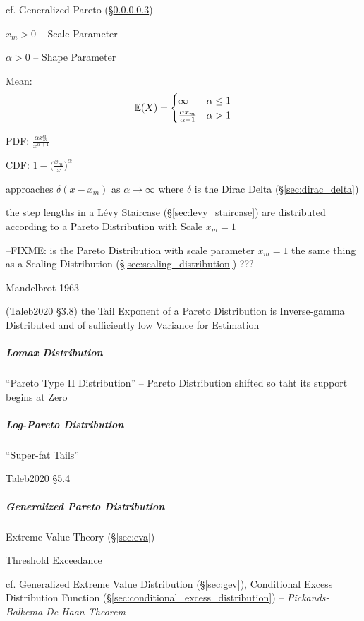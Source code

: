 cf. Generalized Pareto (\S\ref{sec:generalized_pareto})

$x_m > 0$ -- Scale Parameter

$\alpha > 0$ -- Shape Parameter

Mean:
\[
  \mathbb{E}(X) = \begin{cases}
    \infty                      & \alpha \leq 1 \\
    \frac{\alpha x_m}{\alpha-1} & \alpha > 1 \\
  \end{cases}
\]

PDF: $\frac{\alpha x_m^\alpha}{x^{\alpha+1}}$

CDF: $1 - \Big(\frac{x_m}{x}\Big)^\alpha$

approaches $\delta(x - x_m)$ as $\alpha \to \infty$ where $\delta$ is the Dirac
Delta (\S\ref{sec:dirac_delta})

the step lengths in a L\'evy Staircase (\S\ref{sec:levy_staircase}) are
distributed according to a Pareto Distribution with Scale $x_m = 1$

--FIXME: is the Pareto Distribution with scale parameter $x_m = 1$ the same
thing as a Scaling Distribution (\S\ref{sec:scaling_distribution}) ???

Mandelbrot 1963

(Taleb2020 \S 3.8) the Tail Exponent of a Pareto Distribution is Inverse-gamma
Distributed and of sufficiently low Variance for Estimation



\subparagraph{Lomax Distribution}\label{sec:lomax_distribution}\hfill

``Pareto Type II Distribution'' -- Pareto Distribution shifted so taht its
support begins at Zero



\subparagraph{Log-Pareto Distribution}\label{sec:log_pareto}\hfill

``Super-fat Tails''

Taleb2020 \S 5.4



\subparagraph{Generalized Pareto Distribution}\label{sec:generalized_pareto}
\hfill

Extreme Value Theory (\S\ref{sec:eva})

Threshold Exceedance

cf. Generalized Extreme Value Distribution (\S\ref{sec:gev}),
Conditional Excess Distribution Function
(\S\ref{sec:conditional_excess_distribution}) --
\emph{Pickands-Balkema-De Haan Theorem}

